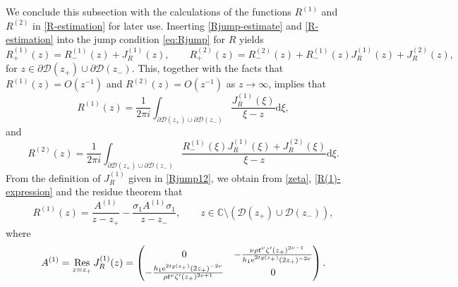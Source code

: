 \documentclass[11pt,a4paper]{article}
\numberwithin{equation}{section}
\def\Res {\mathop{\rm Res}\nolimits}
\begin{document}
We conclude this subsection with the calculations of the functions $R^{(1)}$ and  $R^{(2)}$ in \eqref{R-estimation} for later use. Inserting \eqref{Rjump-estimate} and \eqref{R-estimation} into the jump condition \eqref{eq:Rjump} for $R$ yields
\begin{equation}\label{eq:Rijumps}
R_{+}^{(1)}(z)=R_{-}^{(1)}(z)+J_R^{(1)}(z), \qquad R_{+}^{(2)}(z)=R_{-}^{(2)}(z)+R_{-}^{(1)}(z) J_R^{(1)}(z)+J_R^{(2)}(z),
\end{equation}
for $z\in\partial\mathcal{D}(z_+)\cup\partial\mathcal{D}(z_-)$. This, together with the facts that $R^{(1)}(z)=O\left(z^{-1}\right)$ and $R^{(2)}(z)=O\left(z^{-1}\right)$ as $z\to\infty$, implies that
\begin{equation}\label{R(1)-expression}
R^{(1)}(z)=\frac{1}{2\pi i}\int_{\partial\mathcal{D}(z_+)\cup\partial\mathcal{D}(z_-)}
\frac{J_R^{(1)}(\xi)}{\xi-z}\mathrm{d}\xi,
\end{equation}
and
\begin{equation}\label{R(2)-expression}
R^{(2)}(z)=\frac{1}{2 \pi i} \int_{\partial \mathcal{D}(z_+)\cup\partial\mathcal{D}(z_-)}\frac{R_{-}^{(1)}(\xi) J_R^{(1)}(\xi)+J_R^{(2)}(\xi)}{\xi-z}\mathrm{d}\xi.
\end{equation}
From the definition of $J_R^{(1)}$ given in \eqref{Rjump12}, we obtain from \eqref{zeta}, \eqref{R(1)-expression} and the residue theorem that
\begin{equation}\label{R(1)-expression-new}
R^{(1)}(z)=\frac{A^{(1)}}{z-z_+}-\frac{\sigma_1A^{(1)}\sigma_1}{z-z_-},\qquad z\in\mathbb{C}\setminus \left(\mathcal{D}(z_+)\cup\mathcal{D}(z_-)\right),
\end{equation}
where
\begin{align}\label{A(1)-expression}
A^{(1)}=\Res\limits_{z=z_+}J_R^{(1)}(z)=\begin{pmatrix} 0 & -\frac{\nu\rho{t}^{\nu}\zeta'(z_+)^{2\nu-1}}
{h_1\mathrm{e}^{2tg(z_+)}(2z_+)^{-2\nu}} \\ -\frac{h_1\mathrm{e}^{2tg(z_+)}(2z_+)^{-2\nu}}
{\rho{t}^{\nu}\zeta'(z_+)^{2\nu+1}} & 0 \end{pmatrix}.
\end{align}
\end{document}
